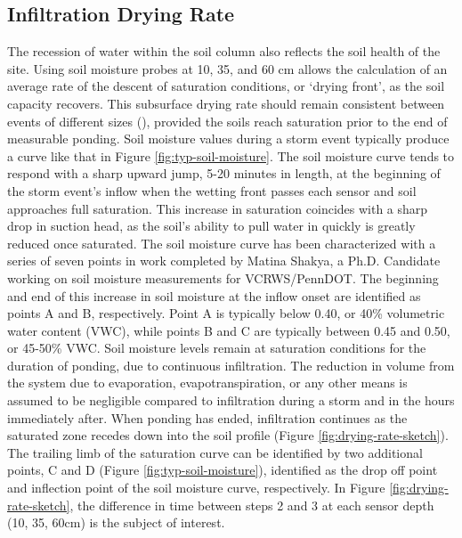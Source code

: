 \subsection{Infiltration Drying Rate}
The recession of water within the soil column also reflects the soil health of the site.
Using soil moisture probes at 10, 35, and 60 cm allows the calculation of an average rate of the descent of saturation conditions, or `drying front', as the soil capacity recovers.
This subsurface drying rate should remain consistent between events of different sizes (\cite{Wadzuk2017}), provided the soils reach saturation prior to the end of measurable ponding.
Soil moisture values during a storm event typically produce a curve like that in Figure \ref{fig:typ-soil-moisture}.
The soil moisture curve tends to respond with a sharp upward jump, 5-20 minutes in length, at the beginning of the storm event's inflow when the wetting front passes each sensor and soil approaches full saturation.
This increase in saturation coincides with a sharp drop in suction head, as the soil's ability to pull water in quickly is greatly reduced once saturated.
The soil moisture curve has been characterized with a series of seven points in work completed by Matina Shakya, a Ph.D. Candidate working on soil moisture measurements for VCRWS/PennDOT.
The beginning and end of this increase in soil moisture at the inflow onset are identified as points A and B, respectively.
Point A is typically below 0.40, or 40\% volumetric water content (VWC), while points B and C are typically between 0.45 and 0.50, or 45-50\% VWC.
Soil moisture levels remain at saturation conditions for the duration of ponding, due to continuous infiltration.
The reduction in volume from the system due to evaporation, evapotranspiration, or any other means is assumed to be negligible compared to infiltration during a storm and in the hours immediately after.
When ponding has ended, infiltration continues as the saturated zone recedes down into the soil profile (Figure \ref{fig:drying-rate-sketch}).
The trailing limb of the saturation curve can be identified by two additional points, C and D (Figure \ref{fig:typ-soil-moisture}), identified as the drop off point and inflection point of the soil moisture curve, respectively.
In Figure \ref{fig:drying-rate-sketch}, the difference in time between steps 2 and 3 at each sensor depth (10, 35, 60cm) is the subject of interest.

